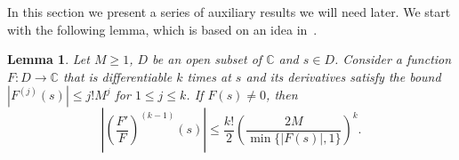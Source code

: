 \documentclass[12pt]{amsart}
\newtheorem{lemma}[theorem]{Lemma}
\theoremstyle{remark}
\newcommand {\SC} {{\mathbb C}}
\numberwithin{equation}{section}
\begin{document}
\medskip


In this section we present a series of auxiliary results we will need later. We start with the following lemma, which is based on an idea in~\cite[p. 40]{ik}.

\begin{lemma}\label{derlemma} Let $M\ge1$, $D$ be an open subset of $\SC$ and $s\in D$. Consider a function $F:D\to\SC$ that is differentiable $k$ times at $s$ and its derivatives satisfy the bound $|F^{(j)}(s)|\le j!M^j$ for $1\le j\le k$. If $F(s)\neq0$, then $$\left|\left(\frac{F'}{F}\right)^{(k-1)}(s)\right|\le \frac{k!}2\left(\frac{2M}{\min\{|F(s)|,1\}}\right)^k.$$
\end{lemma}
\end{document}
